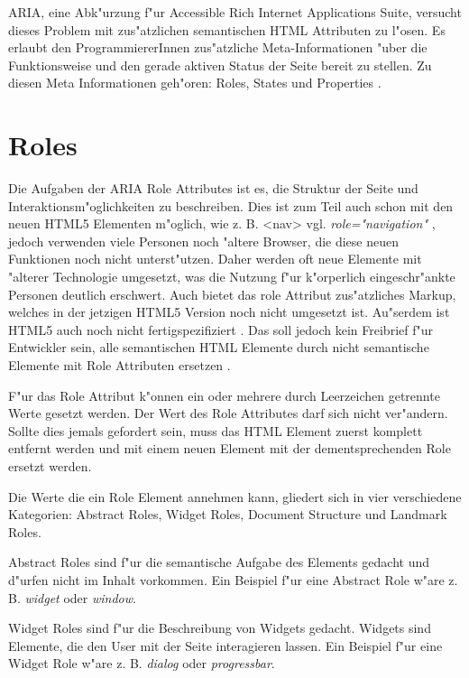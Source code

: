 \documentclass[a4paper,bibtotoc,oneside]{scrbook}
\begin{document}
ARIA, eine Abk"urzung f"ur Accessible Rich Internet Applications Suite, versucht dieses Problem mit zus"atzlichen semantischen HTML Attributen zu l"osen. Es erlaubt den ProgrammiererInnen zus"atzliche Meta-Informationen "uber die Funktionsweise und den gerade aktiven Status der Seite bereit zu stellen. Zu diesen Meta Informationen geh"oren: Roles, States und Properties \cite{aria_intro}. 


\section{Roles}
Die Aufgaben der ARIA Role Attributes ist es, die Struktur der Seite und Interaktionsm"oglichkeiten zu beschreiben. Dies ist zum Teil auch schon mit den neuen HTML5 Elementen m"oglich, wie z. B. <nav> \cite[Abschnitt 4.4.3]{html5} vgl. \emph{role="navigation"} \cite[Abschnitt 3.1]{xhtml_vocab}, jedoch verwenden viele Personen noch "altere Browser, die diese neuen Funktionen noch nicht unterst"utzen. Daher werden oft neue Elemente mit "alterer Technologie umgesetzt, was die Nutzung f"ur k"orperlich eingeschr"ankte Personen deutlich erschwert. Auch bietet das role Attribut zus"atzliches Markup, welches in der jetzigen HTML5 Version noch nicht umgesetzt ist. Au"serdem ist HTML5 auch noch nicht fertigspezifiziert \cite{html5}. Das soll jedoch kein Freibrief f"ur Entwickler sein, alle semantischen HTML Elemente durch nicht semantische Elemente mit Role Attributen ersetzen \cite[Abschnitt 3]{roles}. 

F"ur das Role Attribut k"onnen ein oder mehrere durch Leerzeichen getrennte Werte gesetzt werden. Der Wert des Role Attributes darf sich nicht ver"andern. Sollte dies jemals gefordert sein, muss das HTML Element zuerst komplett entfernt werden und mit einem neuen Element mit der dementsprechenden Role ersetzt werden.\cite[Abschnitt 5]{aria_roles}

Die Werte die ein Role Element annehmen kann, gliedert sich in vier verschiedene Kategorien: Abstract Roles, Widget Roles, Document Structure und Landmark Roles. 

Abstract Roles sind f"ur die semantische Aufgabe des Elements gedacht und d"urfen nicht im Inhalt vorkommen. Ein Beispiel f"ur eine Abstract Role w"are z. B. \emph{widget} oder \emph{window}.\cite[Abschnitt 5.3.1]{aria_roles}

Widget Roles sind f"ur die Beschreibung von Widgets gedacht. Widgets sind Elemente, die den User mit der Seite interagieren lassen\cite[Abschnitt 5.4, widget]{aria_roles}. Ein Beispiel f"ur eine Widget Role w"are z. B. \emph{dialog} oder \emph{progressbar}.\cite[Abschnitt 5.3.2]{aria_roles}
\end{document}
